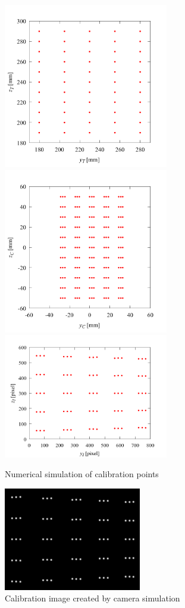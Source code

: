 \documentclass[twocolumn,a4j]{jsarticle}
\begin{document}
\begin{figure}[htbp]
  \centering
  {
    \includegraphics[keepaspectratio, width=72mm]{../images/Calibration/calibration_point_for_tank.png}
    \includegraphics[keepaspectratio, width=72mm]{../images/Calibration/calibration_point_for_camera.png}
    \includegraphics[keepaspectratio, width=72mm]{../images/Calibration/calibration_point_for_screen.png}
  }
  \caption{Numerical simulation of calibration points}
\end{figure}

\begin{figure}[htbp]
  \centering
  \includegraphics[keepaspectratio, width=60mm]{../images/Calibration/simulation.bmp}
  \caption{Calibration image created by camera simulation}
\end{figure}
\end{document}
